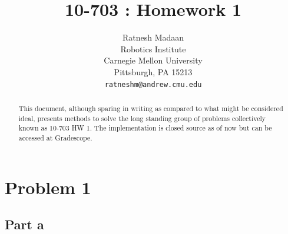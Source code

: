 \documentclass{article}
\title{10-703 : Homework 1}
\author{
  Ratnesh Madaan\\
  Robotics Institute\\
  Carnegie Mellon University\\
  Pittsburgh, PA 15213 \\
  \texttt{ratneshm@andrew.cmu.edu} \\
}
\begin{document}

\maketitle

\begin{abstract}
This document, although sparing in writing as compared to what might be considered ideal, presents methods to solve the long standing group of problems collectively known as 10-703 HW 1. The implementation is closed source as of now but can be accessed at Gradescope. 
\end{abstract}

\section{Problem 1}
\subsection{Part a}
\end{document}
